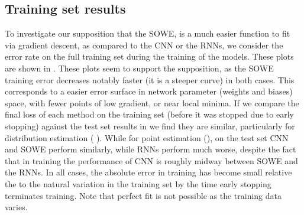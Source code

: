 \documentclass[11pt,a4paper]{article}
\begin{document}
\subsection{Training set results}

To investigate our supposition that the SOWE, is a much easier function to fit via gradient descent, as compared to the CNN or the RNNs, we consider the error rate on the full training set during the training of the models.
These plots are shown in .
These plots seem to support the supposition, as the SOWE training error decreases notably faster (it is a steeper curve) in both cases.
This corresponds to a easier error surface in network parameter (weights and biases) space, with fewer points of low gradient, or near local minima.
If we compare the final loss of each method on the training set (before it was stopped due to early stopping) against the test set results in  
we find they are similar,  particularly for distribution estimation ( ).
While for point estimation (), on the test set CNN and SOWE perform similarly, while RNNs perform much worse, despite the fact that in training the performance of CNN is roughly midway between SOWE and the RNNs.
In all cases, the absolute error in training has become small relative the to the natural variation in the training set by the time early stopping terminates training.
Note that perfect fit is not possible as the training data varies.




\end{document}
